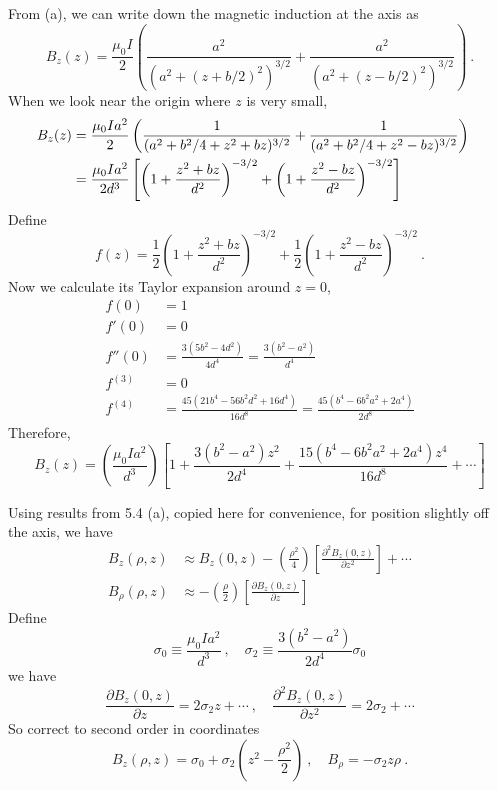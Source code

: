 \documentclass[12pt]{article}
\begin{document}
\newpage
{} From (a), we can write down the magnetic induction at the axis as
\begin{equation}
    B_z (z) = \frac{\mu_0 I}{2} \left(\frac{a^2}{(a^2 + (z+ b/2)^2)^{3/2}} + \frac{a^2}{(a^2 + (z- b/2)^2)^{3/2}}\right)~.
\end{equation}
When we look near the origin where $z$ is very small,
\begin{align}\label{eqn:taylor-expansion}
    B_z(z) &= \frac{\mu_0 I a^2}{2} \left(\frac{1}{(a^2+ b^2/4 + z^2 + bz)^{3/2}} + \frac{1}{(a^2 + b^2/4 + z^2 - bz)^{3/2}}\right)\cr
    &= \frac{\mu_0 I a^2}{2 d^3} \left[\left(1 + \frac{z^2 + bz}{d^2}\right)^{-3/2} + \left(1 + \frac{z^2 - bz}{d^2}\right)^{-3/2}\right]
\end{align}
Define
\begin{equation}
    f(z) = \frac{1}{2}\left(1 + \frac{z^2 + bz}{d^2}\right)^{-3/2} + \frac{1}{2}\left(1 + \frac{z^2 - bz}{d^2}\right)^{-3/2}~.
\end{equation}
Now we calculate its Taylor expansion around $z = 0$,
\begin{align}
    f(0) &= 1 \\
    f'(0) &= 0 \\
    f''(0) &= \frac{3(5 b^2 - 4d^2)}{4 d^4} = \frac{3(b^2 - a^2)}{d^4}\\
    f^{(3)} &= 0 \\
    f^{(4)} &= \frac{45(21 b^4 - 56 b^2 d^2 + 16 d^4)}{16 d^8} = \frac{45(b^4 - 6 b^2 a^2+ 2a^4)}{2d^8}
\end{align}
Therefore,
\begin{equation}
    B_z(z) = \left(\frac{\mu_0 I a^2}{d^3}\right) \left[1 + \frac{3(b^2 - a^2) z^2}{2d^4} + \frac{15(b^4 - 6b^2 a^2 + 2a^4)z^4}{16 d^8} + \cdots\right]
\end{equation}

\newpage
{} Using results from 5.4 (a), copied here for convenience, for position slightly off the axis, we have
\begin{align}
    B_z(\rho, z) &\approx B_z(0,z) - \left(\frac{\rho^2}{4}\right) \left[\frac{\partial^2 B_z(0,z)}{\partial z^2}\right]+ \cdots\\
    B_\rho(\rho, z) &\approx -\left(\frac{\rho}{2}\right) \left[\frac{\partial B_z(0,z)}{\partial z}\right]
\end{align}
Define
\begin{equation}
    \sigma_0 \equiv \frac{\mu_0 I a^2}{d^3}~, \quad \sigma_2 \equiv \frac{3(b^2-a^2)}{2d^4} \sigma_0
\end{equation}
we have
\begin{equation}
    \frac{\partial B_z(0,z)}{\partial z} = 2\sigma_2 z + \cdots~,\quad
    \frac{\partial^2 B_z(0,z)}{\partial z^2} = 2\sigma_2 + \cdots
\end{equation}
So correct to second order in coordinates
\begin{equation}
    B_z(\rho,z) = \sigma_0 + \sigma_2 \left(z^2 - \frac{\rho^2}{2}\right)~, \quad B_\rho = - \sigma_2 z \rho~.
\end{equation}
\end{document}
